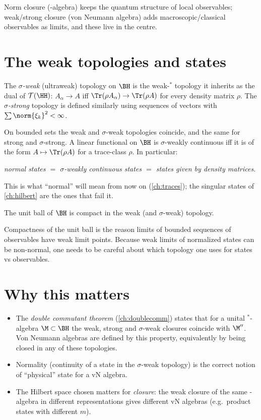 \begin{keyidea}
Norm closure (\cstar-algebra) keeps the quantum structure of local observables; weak/strong closure (von Neumann algebra) adds macroscopic/classical observables as limits, and these live in the centre.
\end{keyidea}

\section{The weak topologies and states}

\begin{definition}
The \emph{$\sigma$-weak} (ultraweak) topology on $\BH$ is the weak-$^*$ topology it inherits as the dual of $\mathcal T(\HH)$: $A_\alpha\to A$ iff $\Tr(\rho A_\alpha)\to\Tr(\rho A)$ for every density matrix $\rho$. The \emph{$\sigma$-strong} topology is defined similarly using sequences of vectors with $\sum\norm{\xi_k}^2<\infty$.
\end{definition}
On bounded sets the weak and $\sigma$-weak topologies coincide, and the same for strong and $\sigma$-strong. A linear functional on $\BH$ is $\sigma$-weakly continuous iff it is of the form $A\mapsto\Tr(\rho A)$ for a trace-class $\rho$. In particular:

\begin{center}
\emph{normal states $=$ $\sigma$-weakly continuous states $=$ states given by density matrices.}
\end{center}
This is what ``normal'' will mean from now on (\cref{ch:traces}); the singular states of \cref{ch:hilbert} are the ones that fail it.

\begin{theorem}
The unit ball of $\BH$ is compact in the weak (and $\sigma$-weak) topology.
\end{theorem}
Compactness of the unit ball is the reason limits of bounded sequences of observables have weak limit points. Because weak limits of normalized states can be non-normal, one needs to be careful about which topology one uses for states vs observables.

\section{Why this matters}

\begin{itemize}
\item The \emph{double commutant theorem} (\cref{ch:doublecomm}) states that for a unital $^*$-algebra $\M\subset\BH$ the weak, strong and $\sigma$-weak closures coincide with $\M''$. Von Neumann algebras are defined by this property, equivalently by being closed in any of these topologies.
\item Normality (continuity of a state in the $\sigma$-weak topology) is the correct notion of ``physical'' state for a vN algebra.
\item The Hilbert space chosen matters for \emph{closure}: the weak closure of the same \cstar-algebra in different representations gives different vN algebras (e.g.\ product states with different $m$).
\end{itemize}

